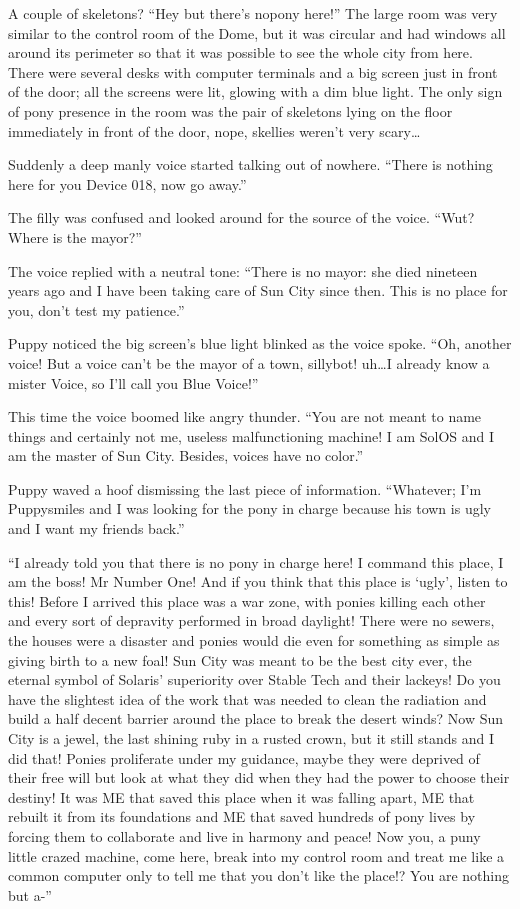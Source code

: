 A couple of skeletons? ``Hey but there's nopony here!'' The large room was very similar to the control room of the Dome, but it was circular and had windows all around its perimeter so that it was possible to see the whole city from here. There were several desks with computer terminals and a big screen just in front of the door; all the screens were lit, glowing with a dim blue light. The only sign of pony presence in the room was the pair of skeletons lying on the floor immediately in front of the door, nope, skellies weren't very scary\dots

Suddenly a deep manly voice started talking out of nowhere. ``There is nothing here for you Device 018, now go away.''

The filly was confused and looked around for the source of the voice. ``Wut? Where is the mayor?''

The voice replied with a neutral tone: ``There is no mayor: she died nineteen years ago and I have been taking care of Sun City since then. This is no place for you, don't test my patience.''

Puppy noticed the big screen's blue light blinked as the voice spoke. ``Oh, another voice! But a voice can't be the mayor of a town, sillybot! uh\dots I already know a mister Voice, so I'll call you Blue Voice!''

This time the voice boomed like angry thunder. ``You are not meant to name things and certainly not me, useless malfunctioning machine! I am SolOS and I am the master of Sun City. Besides, voices have no color.''

Puppy waved a hoof dismissing the last piece of information. ``Whatever; I'm Puppysmiles and I was looking for the pony in charge because his town is ugly and I want my friends back.''

``I already told you that there is no pony in charge here! I command this place, I am the boss! Mr Number One! And if you think that this place is `ugly', listen to this! Before I arrived this place was a war zone, with ponies killing each other and every sort of depravity performed in broad daylight! There were no sewers, the houses were a disaster and ponies would die even for something as simple as giving birth to a new foal! Sun City was meant to be the best city ever, the eternal symbol of Solaris' superiority over Stable Tech and their lackeys! Do you have the slightest idea of the work that was needed to clean the radiation and build a half decent barrier around the place to break the desert winds? Now Sun City is a jewel, the last shining ruby in a rusted crown, but it still stands and I did that! Ponies proliferate under my guidance, maybe they were deprived of their free will but look at what they did when they had the power to choose their destiny! It was ME that saved this place when it was falling apart, ME that rebuilt it from its foundations and ME that saved hundreds of pony lives by forcing them to collaborate and live in harmony and peace! Now you, a puny little crazed machine, come here, break into my control room and treat me like a common computer only to tell me that you don't like the place!? You are nothing but a-''

